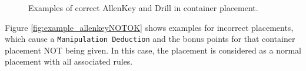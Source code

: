 \begin{figure}[h!]
	\begin{center}
		 \hfill
		 \hfill
		 \hfill
		 \hfill
	\end{center}
	\caption{Examples of correct AllenKey and Drill in container placement.}
	\label{fig:example_allenkeyOK}
\end{figure}

Figure \ref{fig:example_allenkeyNOTOK} shows examples for incorrect placements, which cause a \texttt{Manipulation Deduction} and the bonus points for that container placement NOT being given. In this case, the placement is considered as a normal placement with all associated rules. 


